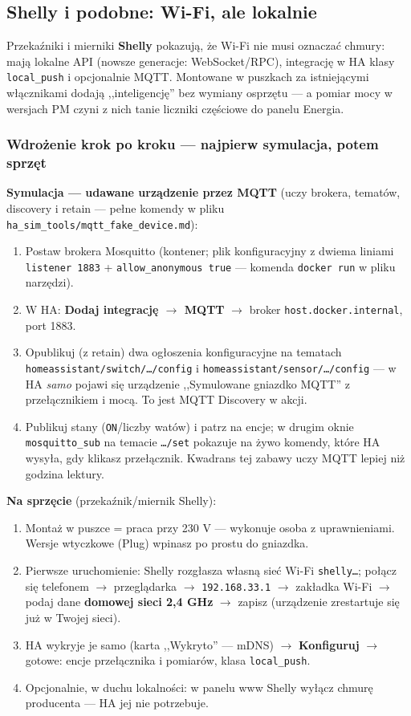 \documentclass[11pt,a4paper]{article}
\begin{document}
\subsection{Shelly i podobne: Wi-Fi, ale lokalnie}

Przekaźniki i mierniki \textbf{Shelly} pokazują, że Wi-Fi nie musi oznaczać chmury: mają lokalne API (nowsze generacje: WebSocket/RPC), integrację w HA klasy \texttt{local\_push} i opcjonalnie MQTT. Montowane w puszkach za istniejącymi włącznikami dodają ,,inteligencję'' bez wymiany osprzętu --- a pomiar mocy w wersjach PM czyni z nich tanie liczniki częściowe do panelu Energia. 

\subsubsection{Wdrożenie krok po kroku --- najpierw symulacja, potem sprzęt}

\textbf{Symulacja --- udawane urządzenie przez MQTT} (uczy brokera, tematów, discovery i retain --- pełne komendy w pliku \texttt{ha\_sim\_tools/mqtt\_fake\_device.md}):
\begin{enumerate}
\item Postaw brokera Mosquitto (kontener; plik konfiguracyjny z dwiema liniami \texttt{listener 1883} + \texttt{allow\_anonymous true} --- komenda \texttt{docker run} w pliku narzędzi).
\item W HA: \textbf{Dodaj integrację $\to$ MQTT} $\to$ broker \texttt{host.docker.internal}, port 1883.
\item Opublikuj (z retain) dwa ogłoszenia konfiguracyjne na tematach \texttt{homeassistant/switch/\ldots/config} i \texttt{homeassistant/sensor/\ldots/config} --- w HA \emph{samo} pojawi się urządzenie ,,Symulowane gniazdko MQTT'' z przełącznikiem i mocą. To jest MQTT Discovery w akcji.
\item Publikuj stany (\texttt{ON}/liczby watów) i patrz na encje; w drugim oknie \texttt{mosquitto\_sub} na temacie \texttt{\ldots/set} pokazuje na żywo komendy, które HA wysyła, gdy klikasz przełącznik. Kwadrans tej zabawy uczy MQTT lepiej niż godzina lektury.
\end{enumerate}

\textbf{Na sprzęcie} (przekaźnik/miernik Shelly):
\begin{enumerate}
\item Montaż w puszce = praca przy 230 V --- wykonuje osoba z uprawnieniami. Wersje wtyczkowe (Plug) wpinasz po prostu do gniazdka.
\item Pierwsze uruchomienie: Shelly rozgłasza własną sieć Wi-Fi \texttt{shelly\ldots}; połącz się telefonem $\to$ przeglądarka $\to$ \texttt{192.168.33.1} $\to$ zakładka Wi-Fi $\to$ podaj dane \textbf{domowej sieci 2,4 GHz} $\to$ zapisz (urządzenie zrestartuje się już w Twojej sieci).
\item HA wykryje je samo (karta ,,Wykryto'' --- mDNS) $\to$ \textbf{Konfiguruj} $\to$ gotowe: encje przełącznika i pomiarów, klasa \texttt{local\_push}.
\item Opcjonalnie, w duchu lokalności: w panelu www Shelly wyłącz chmurę producenta --- HA jej nie potrzebuje.
\end{enumerate}
\end{document}
